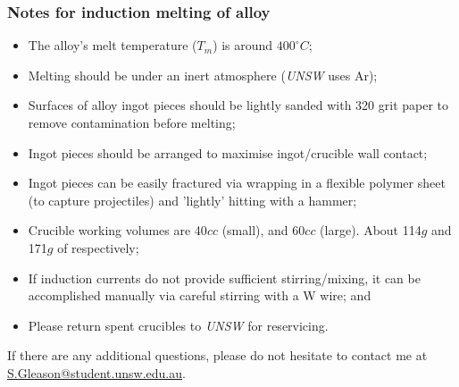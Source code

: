 \subsubsection{Notes for induction melting of \MgZnCa alloy}
\begin{itemize}
\item The \MgZnCa alloy's melt temperature ($T_{m}$) is around $400^{\circ}C$;
\item Melting should be under an inert atmosphere (\textit{UNSW} uses Ar);
\item Surfaces of alloy ingot pieces should be lightly sanded with 320 grit paper to remove contamination before melting;
\item Ingot pieces should be arranged to maximise ingot/crucible wall contact;
\item Ingot pieces can be easily fractured via wrapping in a flexible polymer sheet (to capture projectiles) and 'lightly' hitting with a hammer;
\item Crucible working volumes are 40$cc$ (small), and 60$cc$ (large). About 114$g$ and 171$g$ of \MgZnCa respectively;
\item If induction currents do not provide sufficient stirring/mixing, it can be accomplished manually via careful stirring with a W wire; and
\item Please return spent crucibles to \textit{UNSW} for reservicing. 
\end{itemize}

If there are any additional questions, please do not hesitate to contact me at \href{"mailto:s.gleason@student.unsw.edu.au"}{S.Gleason@student.unsw.edu.au}. 